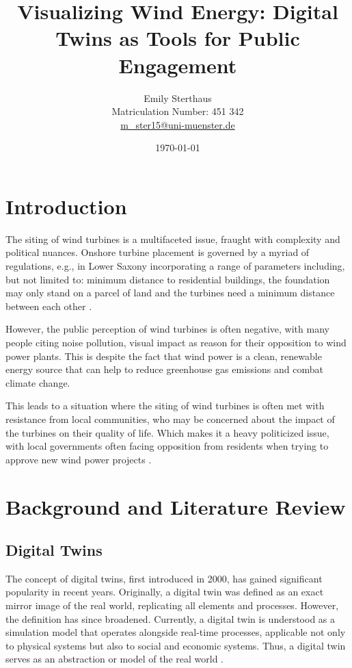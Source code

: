 \documentclass[11pt, titlepage, a4paper]{scrartcl}
\title{Visualizing Wind Energy: Digital Twins as Tools for Public Engagement}
\author{Emily Sterthaus \\ Matriculation Number: 451 342 \\ \href{mailto:m_ster15@uni-muenster.de}{m\_ster15@uni-muenster.de}}
\affil{Institute of Geoinformatics, University of Münster}
\date{\today}
\begin{document}
\maketitle


\newpage
\tableofcontents
\newpage
\begin{linenumbers}
    \section{Introduction}
    The siting of wind turbines is a multifaceted issue, fraught with complexity and political nuances. Onshore
    turbine placement is governed by a myriad of regulations, e.g., in Lower Saxony incorporating a range of parameters including, but not
    limited to: minimum distance to residential buildings, the foundation may only stand on a parcel of land and the
    turbines need a minimum distance between each other
    \cite{niedersachsischesministeriumfurumweltenergieundklimaschutzPlanungUndGenehmigung2021}.

    However, the public perception of wind turbines is often negative, with many people citing noise pollution, visual impact as reason for their opposition to wind power plants. This is despite the fact that wind power is a clean, renewable energy source that can help to reduce greenhouse gas emissions and combat climate change.

    This leads to a situation where the siting of wind turbines is often met with resistance from local communities, who may be concerned about the impact of the turbines on their quality of life. Which makes it a heavy politicized issue, with local governments often facing opposition from residents when trying to approve new wind power projects \cite{kwasniewskiWindenergieVerhindertAntiWindkraftBewegung2021}.

    \section{Background and Literature Review}
    \subsection{Digital Twins}
    The concept of digital twins, first introduced in 2000, has gained significant popularity in recent years. Originally, a digital twin was defined as an exact mirror image of the real world, replicating all elements and processes. However, the definition has since broadened. Currently, a digital twin is understood as a simulation model that operates alongside real-time processes, applicable not only to physical systems but also to social and economic systems. Thus, a digital twin serves as an abstraction or model of the real world \cite{battyDigitalTwins2018}.


\end{linenumbers}
\end{document}
